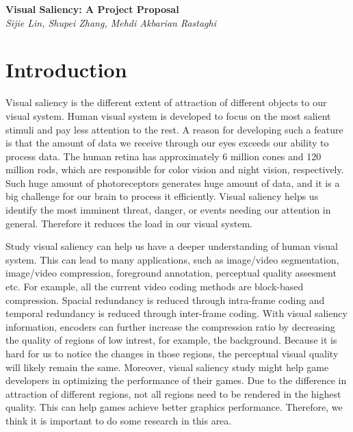 \documentclass[12pt]{article}
\begin{document}
\begin{center}
{\bf \Large Visual Saliency: A Project Proposal}  \\
\vspace{.1in}
{\em Sijie Lin, Shupei Zhang, Mehdi Akbarian Rastaghi}
\end{center}
\section{Introduction}
Visual saliency is the different extent of attraction of different objects to our visual system. Human visual system
is developed to focus on the most salient stimuli and pay less attention to the rest. A reason for developing such a 
feature is that the amount of data we receive through our eyes exceeds our ability to process data. 
The human retina has approximately 6 million cones and 120 million rods\cite{PhotoreceptorCell2021}, which are responsible for color vision 
and night vision, respectively. Such huge amount of photoreceptors generates huge amount of data, and it is a big challenge for our brain to 
process it efficiently.
Visual saliency helps us identify the most imminent threat, danger, or events needing our attention in general. Therefore it reduces 
the load in our visual system.

Study visual saliency can help us have a deeper understanding of human visual system. This can lead to many applications, such as
image/video segmentation, image/video compression, foreground annotation, perceptual quality assesment etc\cite{congReviewVisualSaliency2019}.
For example, all the current video coding methods are block-based compression. Spacial redundancy is reduced through intra-frame coding and temporal 
redundancy is reduced through inter-frame coding\cite{sullivanOverviewHighEfficiency2012}. With visual saliency information, encoders can further increase
the compression ratio by decreasing the quality of regions of low intrest, for example, the background. Because it is hard for us to notice the changes in those regions,
the perceptual visual quality will likely remain the same. Moreover, visual saliency study might help game developers in optimizing the performance 
of their games. Due to the difference in attraction of different regions, not all regions need to be rendered in the highest quality.
This can help games achieve better graphics performance. Therefore, we think it is important to do some research in this area.
\end{document}

